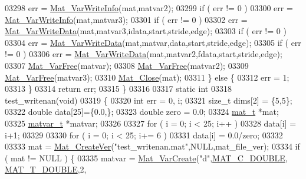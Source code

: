 \begin{DoxyCode}
{{{{{{{{{{{{{{{{{{{{{{{{{{{{{{{{{{{{{{{{{{{{{{{{{{{{{{{{{{{{03298             err = \hyperlink{group___m_a_t_ga1ae164415dfd98cdf48ad07033b6e0bb}{Mat\_VarWriteInfo}(mat,matvar2);
03299         \textcolor{keywordflow}{if} ( err != 0 )
03300             err = \hyperlink{group___m_a_t_ga1ae164415dfd98cdf48ad07033b6e0bb}{Mat\_VarWriteInfo}(mat,matvar3);
03301         \textcolor{keywordflow}{if} ( err != 0 )
03302             err = \hyperlink{group___m_a_t_ga43179b930fb30c025a153a55a083a98a}{Mat\_VarWriteData}(mat,matvar3,idata,start,stride,edge);
03303         \textcolor{keywordflow}{if} ( err != 0 )
03304             err = \hyperlink{group___m_a_t_ga43179b930fb30c025a153a55a083a98a}{Mat\_VarWriteData}(mat,matvar,data,start,stride,edge);
03305         \textcolor{keywordflow}{if} ( err != 0 )
03306             err = \hyperlink{group___m_a_t_ga43179b930fb30c025a153a55a083a98a}{Mat\_VarWriteData}(mat,matvar2,fdata,start,stride,edge);
03307         \hyperlink{group___m_a_t_ga1d14716f7450530fd1c9d02413787f0e}{Mat\_VarFree}(matvar);
03308         \hyperlink{group___m_a_t_ga1d14716f7450530fd1c9d02413787f0e}{Mat\_VarFree}(matvar2);
03309         \hyperlink{group___m_a_t_ga1d14716f7450530fd1c9d02413787f0e}{Mat\_VarFree}(matvar3);
03310         \hyperlink{group___m_a_t_ga101c92ff7bde4a2d4615661beba09262}{Mat\_Close}(mat);
03311     \} \textcolor{keywordflow}{else} \{
03312         err = 1;
03313     \}
03314     \textcolor{keywordflow}{return} err;
03315 \}
03316 
03317 \textcolor{keyword}{static} \textcolor{keywordtype}{int}
03318 test\_writenan(\textcolor{keywordtype}{void})
03319 \{
03320     \textcolor{keywordtype}{int}        err = 0, i;
03321     \textcolor{keywordtype}{size\_t}     dims[2] = \{5,5\};
03322     \textcolor{keywordtype}{double}     data[25]=\{0.0,\};
03323     \textcolor{keywordtype}{double}     zero = 0.0;
03324     \hyperlink{struct__mat__t}{mat\_t}    *mat;
03325     \hyperlink{group___m_a_t_structmatvar__t}{matvar\_t} *matvar;
03326 
03327     \textcolor{keywordflow}{for} ( i = 0; i < 25; i++ )
03328          data[i] = i+1;
03329 
03330     \textcolor{keywordflow}{for} ( i = 0; i < 25; i+= 6 )
03331         data[i] = 0.0/zero;
03332 
03333     mat = \hyperlink{group___m_a_t_ga22d404f203af7869c841400e7ad247cf}{Mat\_CreateVer}(\textcolor{stringliteral}{"test\_writenan.mat"},NULL,mat\_file\_ver);
03334     \textcolor{keywordflow}{if} ( mat != NULL ) \{
03335         matvar = \hyperlink{group___m_a_t_ga1c54a84bb4d810c6fccdb8869489eac4}{Mat\_VarCreate}(\textcolor{stringliteral}{"d"},\hyperlink{group___m_a_t_ggad4d60ae7b709fc81bfd744fb4c857c40a5d70e0862e5bdb7bd86bf7ba5948f307}{MAT\_C\_DOUBLE},
      \hyperlink{group___m_a_t_ggacf7b3b879282b7ab3a51190e49bf3453a31e721ecf7e188196f83c32838288797}{MAT\_T\_DOUBLE},2,
}}}}}}}}}}}}}}}}}}}}}}}}}}}}}}}}}}}}}}}}}}}}}}}}}}}}}}}}}}}}
\end{DoxyCode}
